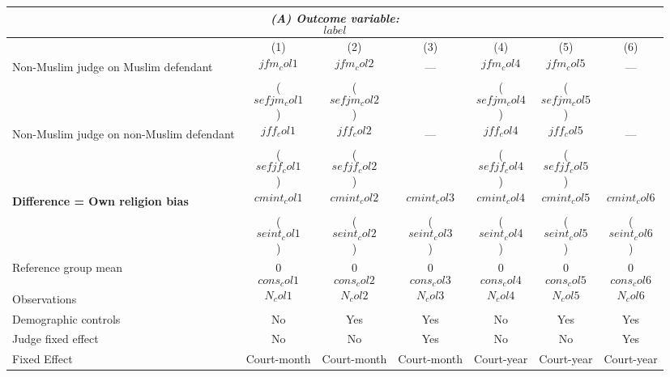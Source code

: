 {
\def\sym#1{\ifmmode^{#1}\else\(^{#1}\)\fi}
\begin{tabular}{l*{6}{c}}
  \hline\hline
\multicolumn{7}{c}{\textit{(A) Outcome variable: $$label$$}}\\
\hline
&\multicolumn{1}{c}{(1)}&\multicolumn{1}{c}{(2)}&\multicolumn{1}{c}{(3)}&\multicolumn{1}{c}{(4)}&\multicolumn{1}{c}{(5)}&\multicolumn{1}{c}{(6)}\\
\hline
Non-Muslim judge on Muslim defendant \hspace{15mm}& $$jfm_col1$$ & $$jfm_col2$$ & --- & $$jfm_col4$$ & $$jfm_col5$$ & --- \\
& ($$sefjm_col1$$) & ($$sefjm_col2$$) &  & ($$sefjm_col4$$) &($$sefjm_col5$$) &  \\
Non-Muslim judge on non-Muslim defendant \hspace{15mm}& $$jff_col1$$ & $$jff_col2$$ & ---& $$jff_col4$$ & $$jff_col5$$ & --- \\
& ($$sefjf_col1$$) & ($$sefjf_col2$$) &  & ($$sefjf_col4$$) & ($$sefjf_col5$$) &  \\
\textbf{Difference = Own religion bias} & $$cmint_col1$$ & $$cmint_col2$$ & $$cmint_col3$$ & $$cmint_col4$$ & $$cmint_col5$$ & $$cmint_col6$$ \\
& ($$seint_col1$$) & ($$seint_col2$$) & ($$seint_col3$$) & ($$seint_col4$$) & ($$seint_col5$$) & ($$seint_col6$$) \\
\hline
Reference group mean & 0$$cons_col1$$ & 0$$cons_col2$$ & 0$$cons_col3$$ & 0$$cons_col4$$ & 0$$cons_col5$$ & 0$$cons_col6$$ \\
Observations & $$N_col1$$ & $$N_col2$$ & $$N_col3$$ & $$N_col4$$ & $$N_col5$$ & $$N_col6$$ \\
Demographic controls & No & Yes & Yes & No & Yes & Yes \\
Judge fixed effect & No & No & Yes & No & No & Yes \\
Fixed Effect & Court-month & Court-month & Court-month & Court-year & Court-year & Court-year \\
\hline\hline
\end{tabular}
}
 
